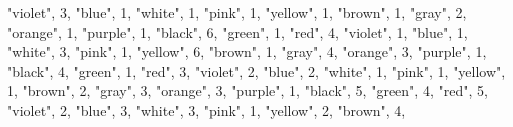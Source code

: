 \documentclass[
]{article}
\newenvironment{Shaded}{\begin{snugshade}}{\end{snugshade}}
\newcommand{\DecValTok}[1]{\textcolor[rgb]{0.00,0.00,0.81}{#1}}
\newcommand{\NormalTok}[1]{#1}
\newcommand{\StringTok}[1]{\textcolor[rgb]{0.31,0.60,0.02}{#1}}
\begin{document}
\begin{Shaded}
\begin{Highlighting}[]
  \StringTok{"violet"}\NormalTok{, }\DecValTok{3}\NormalTok{,}
  \StringTok{"blue"}\NormalTok{, }\DecValTok{1}\NormalTok{,}
  \StringTok{"white"}\NormalTok{, }\DecValTok{1}\NormalTok{,}
  \StringTok{"pink"}\NormalTok{, }\DecValTok{1}\NormalTok{,}
  \StringTok{"yellow"}\NormalTok{, }\DecValTok{1}\NormalTok{,}
  \StringTok{"brown"}\NormalTok{, }\DecValTok{1}\NormalTok{,}
  \StringTok{"gray"}\NormalTok{, }\DecValTok{2}\NormalTok{,}
  \StringTok{"orange"}\NormalTok{, }\DecValTok{1}\NormalTok{,}
  \StringTok{"purple"}\NormalTok{, }\DecValTok{1}\NormalTok{,}
    \StringTok{"black"}\NormalTok{, }\DecValTok{6}\NormalTok{,}
  \StringTok{"green"}\NormalTok{, }\DecValTok{1}\NormalTok{,}
  \StringTok{"red"}\NormalTok{, }\DecValTok{4}\NormalTok{,}
  \StringTok{"violet"}\NormalTok{, }\DecValTok{1}\NormalTok{,}
  \StringTok{"blue"}\NormalTok{, }\DecValTok{1}\NormalTok{,}
  \StringTok{"white"}\NormalTok{, }\DecValTok{3}\NormalTok{,}
  \StringTok{"pink"}\NormalTok{, }\DecValTok{1}\NormalTok{,}
  \StringTok{"yellow"}\NormalTok{, }\DecValTok{6}\NormalTok{,}
  \StringTok{"brown"}\NormalTok{, }\DecValTok{1}\NormalTok{,}
  \StringTok{"gray"}\NormalTok{, }\DecValTok{4}\NormalTok{,}
  \StringTok{"orange"}\NormalTok{, }\DecValTok{3}\NormalTok{,}
  \StringTok{"purple"}\NormalTok{, }\DecValTok{1}\NormalTok{,}
    \StringTok{"black"}\NormalTok{, }\DecValTok{4}\NormalTok{,}
  \StringTok{"green"}\NormalTok{, }\DecValTok{1}\NormalTok{,}
  \StringTok{"red"}\NormalTok{, }\DecValTok{3}\NormalTok{,}
  \StringTok{"violet"}\NormalTok{, }\DecValTok{2}\NormalTok{,}
  \StringTok{"blue"}\NormalTok{, }\DecValTok{2}\NormalTok{,}
  \StringTok{"white"}\NormalTok{, }\DecValTok{1}\NormalTok{,}
  \StringTok{"pink"}\NormalTok{, }\DecValTok{1}\NormalTok{, }
  \StringTok{"yellow"}\NormalTok{, }\DecValTok{1}\NormalTok{,}
  \StringTok{"brown"}\NormalTok{, }\DecValTok{2}\NormalTok{,}
  \StringTok{"gray"}\NormalTok{, }\DecValTok{3}\NormalTok{,}
  \StringTok{"orange"}\NormalTok{, }\DecValTok{3}\NormalTok{,}
  \StringTok{"purple"}\NormalTok{, }\DecValTok{1}\NormalTok{,}
    \StringTok{"black"}\NormalTok{, }\DecValTok{5}\NormalTok{,}
  \StringTok{"green"}\NormalTok{, }\DecValTok{4}\NormalTok{,}
  \StringTok{"red"}\NormalTok{, }\DecValTok{5}\NormalTok{,}
  \StringTok{"violet"}\NormalTok{, }\DecValTok{2}\NormalTok{,}
  \StringTok{"blue"}\NormalTok{, }\DecValTok{3}\NormalTok{,}
  \StringTok{"white"}\NormalTok{, }\DecValTok{3}\NormalTok{,}
  \StringTok{"pink"}\NormalTok{, }\DecValTok{1}\NormalTok{,}
  \StringTok{"yellow"}\NormalTok{, }\DecValTok{2}\NormalTok{,}
  \StringTok{"brown"}\NormalTok{, }\DecValTok{4}\NormalTok{,}

\end{Highlighting}
\end{Shaded}
\end{document}

